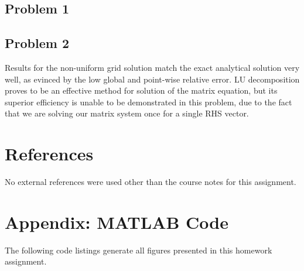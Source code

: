 \documentclass[11pt]{article}
\begin{document}
\subsection{Problem 1}

\subsection{Problem 2}

Results for the non-uniform grid solution match the exact analytical solution very well, as evinced by the low global and point-wise relative error. LU decomposition proves to be an effective method for solution of the matrix equation, but its superior efficiency is unable to be demonstrated in this problem, due to the fact that we are solving our matrix system once for a single RHS vector.

\section{References} %

No external references were used other than the course notes for this assignment.

\section*{Appendix: MATLAB Code} %

The following code listings generate all figures presented in this homework assignment.


\end{document}

